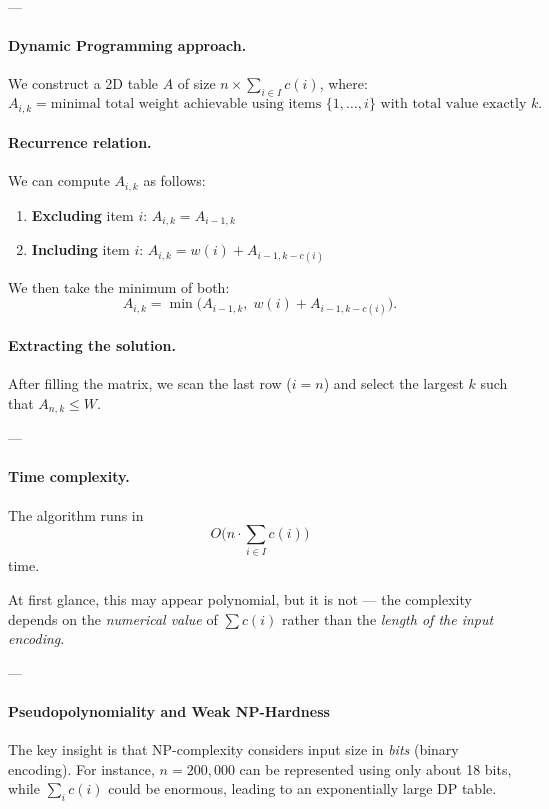 \documentclass{article}
\begin{document}
---

\paragraph{Dynamic Programming approach.}  
We construct a 2D table $A$ of size $n \times \sum_{i \in I} c(i)$, where:
\[
A_{i,k} = \text{minimal total weight achievable using items } \{1, \dots, i\} \text{ with total value exactly } k.
\]

\paragraph{Recurrence relation.}  
We can compute $A_{i,k}$ as follows:
\begin{enumerate}
    \item \textbf{Excluding} item $i$: \quad $A_{i,k} = A_{i-1,k}$
    \item \textbf{Including} item $i$: \quad $A_{i,k} = w(i) + A_{i-1,k - c(i)}$
\end{enumerate}

We then take the minimum of both:
\[
A_{i,k} = \min\big( A_{i-1,k},\; w(i) + A_{i-1,k - c(i)} \big).
\]

\paragraph{Extracting the solution.}  
After filling the matrix, we scan the last row ($i = n$) and select the largest $k$ such that $A_{n,k} \le W$.

---

\paragraph{Time complexity.}  
The algorithm runs in
\[
O\big(n \cdot \sum_{i \in I} c(i)\big)
\]
time.

At first glance, this may appear polynomial, but it is not — the complexity depends on the \emph{numerical value} of $\sum c(i)$ rather than the \emph{length of the input encoding}.

---

\paragraph{Pseudopolynomiality and Weak NP-Hardness}

The key insight is that NP-complexity considers input size in \emph{bits} (binary encoding).  
For instance, $n = 200{,}000$ can be represented using only about 18 bits, while $\sum_i c(i)$ could be enormous, leading to an exponentially large DP table.
\end{document}
